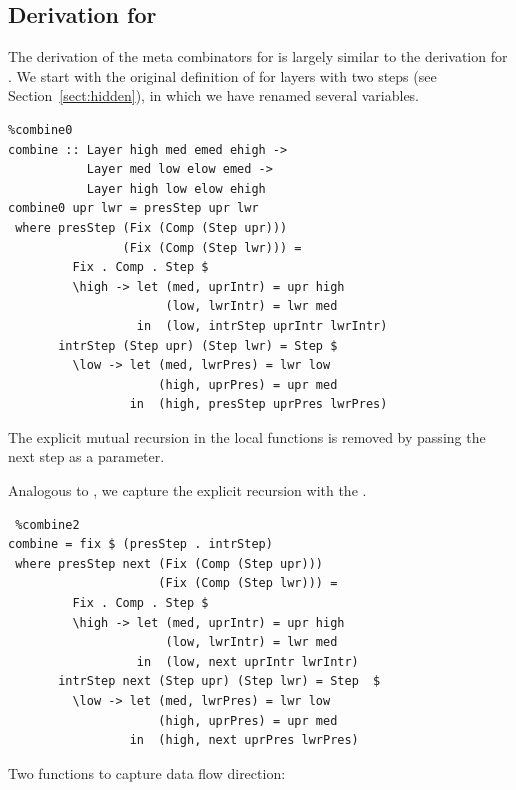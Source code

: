 \documentclass[preprint,natbib]{sigplanconf}
\begin{document}
%																
\subsection{Derivation for } \label{subsubsectcombine}


The derivation of the meta combinators for  is largely similar to the derivation for . We start with the original definition of  for layers with two steps (see Section~\ref{sect:hidden}), in which we have renamed several variables. 


\begin{small} %
\begin{verbatim}%combine0
combine :: Layer high med emed ehigh -> 
           Layer med low elow emed -> 
           Layer high low elow ehigh
combine0 upr lwr = presStep upr lwr
 where presStep (Fix (Comp (Step upr))) 
                (Fix (Comp (Step lwr))) = 
         Fix . Comp . Step $ 
         \high -> let (med, uprIntr) = upr high
                      (low, lwrIntr) = lwr med
                  in  (low, intrStep uprIntr lwrIntr)
       intrStep (Step upr) (Step lwr) = Step $
         \low -> let (med, lwrPres) = lwr low
                     (high, uprPres) = upr med
                 in  (high, presStep uprPres lwrPres)
\end{verbatim}
\end{small}

The explicit mutual recursion in the local functions is removed by passing the next step as a parameter.

Analogous to , we capture the explicit recursion with the .

\begin{small}
\begin{verbatim} %combine2
combine = fix $ (presStep . intrStep) 
 where presStep next (Fix (Comp (Step upr)))
                     (Fix (Comp (Step lwr))) =
         Fix . Comp . Step $ 
         \high -> let (med, uprIntr) = upr high
                      (low, lwrIntr) = lwr med
                  in  (low, next uprIntr lwrIntr)
       intrStep next (Step upr) (Step lwr) = Step  $
         \low -> let (med, lwrPres) = lwr low
                     (high, uprPres) = upr med
                 in  (high, next uprPres lwrPres)
\end{verbatim}%
\end{small}


Two functions to capture data flow direction:
\end{document}

